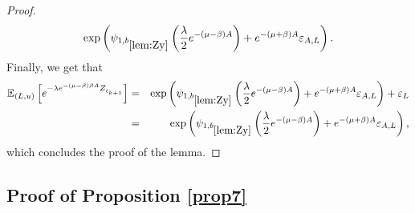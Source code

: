 \documentclass[11pt]{article}
\theoremstyle{plain}
\newcommand\vep{\varepsilon}
\begin{document}
\begin{proof}
\begin{eqnarray*}
\exp\left(\psi_{1,b_{\ref{lem:Zy}}}\left(\frac{\lambda}{2}e^{-(\mu-\beta)A}\right)+e^{-(\mu+\beta)A}\vep_{A,L}\right).
\end{eqnarray*}
Finally, we get that
 \begin{eqnarray*}
\mathbb{E}_{(L,u)}\left[e^{-\lambda e^{-(\mu-\beta)\beta A} Z^{}_{t_{k+1}}}\right]&=&\exp\left(\psi_{1,b_{\ref{lem:Zy}}}\left(\frac{\lambda}{2}e^{-(\mu-\beta) A}\right)+e^{-(\mu+\beta)A}\vep_{A,L}\right)+\vep_L\\
&=& \exp\left(\psi_{1,b_{\ref{lem:Zy}}}\left(\frac{\lambda}{2}e^{-(\mu-\beta) A}\right)+e^{-(\mu+\beta)A}\vep_{A,L}\right),
\end{eqnarray*} 
which concludes the proof of the lemma.
\end{proof}

\subsection{Proof of Proposition \ref{prop7}}\label{sec:62}

\newcommand\zu{Z^{A,(u)}}
\end{document}
